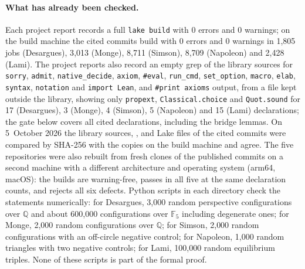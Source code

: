 \documentclass[11pt]{article}
\theoremstyle{definition}
\theoremstyle{remark}
\newcommand{\lean}[1]{\texttt{#1}}
\newcommand{\F}{\mathbb{F}}
\newcommand{\QQ}{\mathbb{Q}}
\begin{document}
\paragraph{What has already been checked.} Each project report records a full \lean{lake build}
with 0 errors and 0 warnings; on the build machine the cited commits build with 0 errors and 0
warnings in 1{,}805 jobs (Desargues), 3{,}013 (Monge), 8{,}711 (Simson), 8{,}709 (Napoleon) and
2{,}428 (Lami). The project reports also record an empty grep of the library sources for \lean{sorry},
\lean{admit}, \lean{native\_decide}, \lean{axiom}, \lean{\#eval}, \lean{run\_cmd},
\lean{set\_option}, \lean{macro}, \lean{elab}, \lean{syntax}, \lean{notation} and
\lean{import Lean}, and \lean{\#print axioms} output, from a file kept outside the library, showing
only \lean{propext}, \lean{Classical.choice} and \lean{Quot.sound} for 17 (Desargues), 3 (Monge),
4 (Simson), 5 (Napoleon) and 15 (Lami) declarations; the gate below covers all cited
declarations, including the bridge lemmas. On 5~October 2026 the library sources,
,  and Lake files of the cited commits were compared by SHA-256
with the copies on the build machine and agree. The five repositories were also rebuilt from fresh
clones of the published commits on a second machine with a different architecture and operating
system (arm64, macOS): the builds are warning-free,  passes in all five at the same
declaration counts, and  rejects all six defects. Python scripts in each
 directory check the statements numerically: for Desargues, 3{,}000 random perspective
configurations over $\QQ$ and about 600{,}000 configurations over $\F_5$ including degenerate ones;
for Monge, 2{,}000 random configurations over $\QQ$; for Simson, 2{,}000 random configurations with
an off-circle negative control; for Napoleon, 1{,}000 random triangles with two negative controls;
for Lami, 100{,}000 random equilibrium triples. None of these scripts is part of the formal proof.
\end{document}
